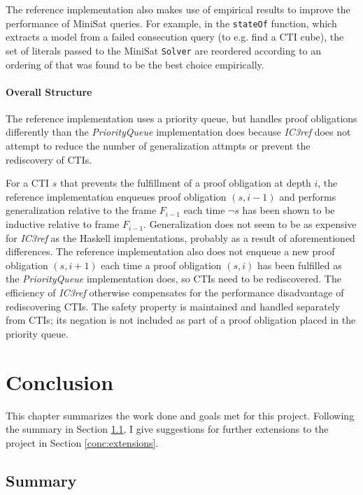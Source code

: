 \documentclass[12pt,a4paper,twoside,openright]{report}
\begin{document}
{The reference implementation also makes use of empirical results to improve the performance of MiniSat queries.
For example, in the \verb,stateOf, function, which extracts a model from a failed consecution query
(to e.g. find a CTI cube), the set of literals passed to the MiniSat \verb,Solver, are reordered according
to an ordering of that was found to be the best choice empirically.

\subsubsection{Overall Structure}

The reference implementation uses a priority queue, but handles proof obligations
differently than the {\it PriorityQueue} implementation does because \emph{IC3ref}
does not attempt to reduce the number of generalization attmpts or prevent
the rediscovery of CTIs.

For a CTI $s$ that prevents the fulfillment
of a proof obligation at depth $i$, the reference implementation enqueues proof
obligation $(s,i - 1)$
and performs generalization relative to the frame $F_{i - 1}$ each time $\neg s$ has been shown
to be inductive relative to frame $F_{i - 1}$. Generalization does not seem
to be as expensive for \emph{IC3ref} as the Haskell implementations, probably as a
result of aforementioned differences.
The reference implementation also does not
enqueue a new proof obligation $(s, i+1)$ each time a proof obligation $(s, i)$ has been
fulfilled as the \emph{PriorityQueue} implementation does,
so CTIs need to be rediscovered. The efficiency of \emph{IC3ref} otherwise compensates
for the performance disadvantage of rediscovering CTIs.
The safety property is maintained and
handled separately from CTIs; its negation is not included as part of a proof obligation
placed in the priority queue.

\chapter{Conclusion}
\label{conc}

This chapter summarizes the work done and goals met for this project.
Following the summary in Section \ref{conc:summary}, I give
suggestions for further extensions to the project in Section \ref{conc:extensions}.

\section{Summary}
\label{conc:summary}

}
\end{document}
